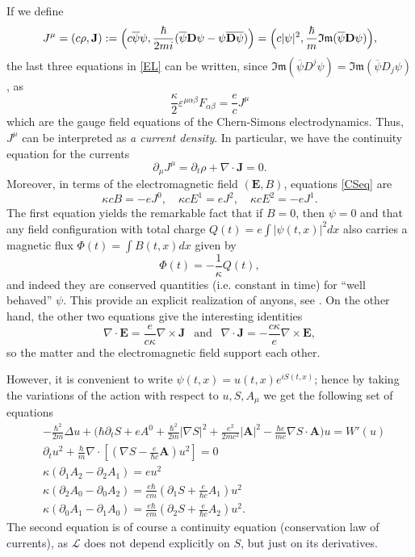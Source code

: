 \documentclass[11pt,leqno,twoside,reqno]{amsart}
\numberwithin{equation}{section}
\begin{document}
If we define
\begin{equation*}\label{correnti}
 J^{\mu}=(c\rho,{\mathbf{J}}):= \Big(c \overline \psi \psi, \frac{\hbar}{2mi}(\overline\psi \mathbf D \psi -\psi \overline{\mathbf D \psi})\Big)
 =\Big(c |\psi|^{2} , \frac{\hbar}{m} \mathfrak{Im}(\overline \psi {\bf D}\psi)\Big),
\end{equation*}
 the last three equations in \eqref{EL} can be written,
 since $\mathfrak{Im}(\overline \psi  D^j \psi)=\mathfrak{Im}(\overline \psi  D_j \psi)$, as
\begin{equation}\label{CSeq}
\frac{\kappa}{2}\varepsilon^{\mu\alpha\beta}F_{\alpha\beta}=\frac{e}{c}J^{\mu}
\end{equation}
which are the gauge field equations of the Chern-Simons electrodynamics. Thus,
$J^{\mu}$ can be interpreted as {\sl a current density}.
In particular, we have the continuity equation for the currents $$\partial_{\mu}J^{\mu}=\partial_t \rho+\nabla\cdot\mathbf{J}=0.$$
Moreover, in terms of the electromagnetic field $(\mathbf E, B)$, equations \eqref{CSeq} are
\[
\kappa c B=-e J^{0},
\quad
\kappa c E^1=eJ^2,
\quad
\kappa c E^2=-eJ^1.
\]
The first equation yields the remarkable fact that
if $B=0$, then $\psi=0$ and that
any field configuration with total charge $Q(t)=e\int |\psi(t,x)|^{2}dx$ also carries a magnetic flux $\Phi(t)=\int B(t,x)dx$ given by
$$\Phi(t)=-\frac{1}{\kappa}Q(t),$$ and indeed they are conserved quantities (i.e. constant in time)
for ``well behaved'' $\psi$. This provide an explicit realization of anyons, see \cite{L,W}.
On the other hand, the other  two equations give the interesting identities
$$\nabla \cdot \mathbf E= \frac{e}{c\kappa}\nabla \times \mathbf J
\ \ \text{ and } \ \ \nabla\cdot \mathbf J=-\frac{c\kappa}{e}\nabla \times\mathbf E,$$
so the matter and the electromagnetic field support each other.

However, it is convenient to  write $\psi(t,x)=u(t,x)e^{i S(t,x)}$; 
hence by taking the variations of the action with respect to $u,S, A_{\mu}$
we get the following set of equations
\begin{equation}\label{ELS}
\begin{split}
&-\frac{\hbar^{2}}{2m}\Delta u+ \Big(\hbar\partial_{t}S+e A^{0}+\frac{\hbar^{2}}{2m}|\nabla S|^{2}
+\frac{e^{2}}{2mc^{2}}|\mathbf A|^{2}-\frac{\hbar e}{mc} \nabla S \cdot \mathbf A\Big)u= W' (u)\\ 
&\partial_{t}u^{2}+\frac{\hbar}{m}\nabla \cdot \left[\left(\nabla S - \frac{e}{\hbar c}\mathbf{A}\right)u^2\right]=0\\ 
& 
\kappa(\partial_{1}A_{2}-\partial_{2}A_{1})=e u^{2} \\ 
& 
\kappa(\partial_{2}A_{0}-\partial_{0}A_{2})=\frac{e\hbar}{cm}\left(\partial_1 S + \frac{e}{\hbar c}A_1\right)u^2\\ 
& 
\kappa(\partial_{0}A_{1}-\partial_{1}A_{0})=\frac{e\hbar}{cm}\left(\partial_2 S + \frac{e}{\hbar c}A_2\right)u^2. 
\end{split}
\end{equation}
The second equation is of course a continuity equation  (conservation law of currents),
as $\mathcal L$ does not depend explicitly
on $S$, but just on its  derivatives.
\end{document}
